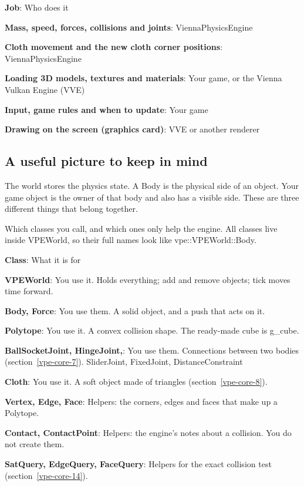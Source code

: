 \documentclass[11pt,a4paper]{article}
\begin{document}
\textbf{Job}: Who does it

\textbf{Mass, speed, forces, collisions and joints}: ViennaPhysicsEngine

\textbf{Cloth movement and the new cloth corner positions}: ViennaPhysicsEngine

\textbf{Loading 3D models, textures and materials}: Your game, or the Vienna Vulkan Engine (VVE)

\textbf{Input, game rules and when to update}: Your game

\textbf{Drawing on the screen (graphics card)}: VVE or another renderer

\subsection*{A useful picture to keep in mind}
The world stores the physics state. A Body is the physical side of an object. Your game object is the owner of that body and also has a visible side. These are three different things that belong together.

\label{vpe-core-2}
Which classes you call, and which ones only help the engine. All classes live inside VPEWorld, so their full names look like vpe::VPEWorld::Body.

\textbf{Class}: What it is for

\textbf{VPEWorld}: You use it. Holds everything; add and remove objects; tick moves time forward.

\textbf{Body, Force}: You use them. A solid object, and a push that acts on it.

\textbf{Polytope}: You use it. A convex collision shape. The ready-made cube is g\_cube.

\textbf{BallSocketJoint, HingeJoint,}: You use them. Connections between two bodies (section~\ref{vpe-core-7}). SliderJoint, FixedJoint, DistanceConstraint

\textbf{Cloth}: You use it. A soft object made of triangles (section~\ref{vpe-core-8}).

\textbf{Vertex, Edge, Face}: Helpers: the corners, edges and faces that make up a Polytope.

\textbf{Contact, ContactPoint}: Helpers: the engine's notes about a collision. You do not create them.

\textbf{SatQuery, EdgeQuery, FaceQuery}: Helpers for the exact collision test (section~\ref{vpe-core-14}).
\end{document}

